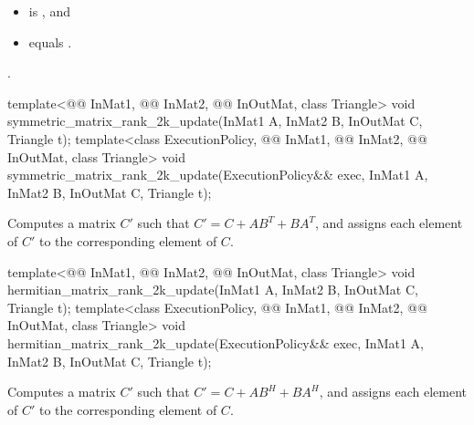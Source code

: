 \pnum
\expects
\begin{itemize}
\item
{} is , and
\item
{} equals .
\end{itemize}

\pnum
\complexity
{}.

%
\begin{itemdecl}
template<@@ InMat1, @@ InMat2,
         @@ InOutMat, class Triangle>
  void symmetric_matrix_rank_2k_update(InMat1 A, InMat2 B, InOutMat C, Triangle t);
template<class ExecutionPolicy, @@ InMat1, @@ InMat2,
         @@ InOutMat, class Triangle>
  void symmetric_matrix_rank_2k_update(ExecutionPolicy&& exec,
                                       InMat1 A, InMat2 B, InOutMat C, Triangle t);
\end{itemdecl}

\begin{itemdescr}
\pnum
\effects
Computes a matrix $C'$ such that $C' = C + A B^T + B A^T$,
and assigns each element of $C'$ to the corresponding element of $C$.
\end{itemdescr}

%
\begin{itemdecl}
template<@@ InMat1, @@ InMat2,
         @@ InOutMat, class Triangle>
  void hermitian_matrix_rank_2k_update(InMat1 A, InMat2 B, InOutMat C, Triangle t);
template<class ExecutionPolicy,
         @@ InMat1, @@ InMat2,
         @@ InOutMat, class Triangle>
  void hermitian_matrix_rank_2k_update(ExecutionPolicy&& exec,
                                       InMat1 A, InMat2 B, InOutMat C, Triangle t);
\end{itemdecl}

\begin{itemdescr}
\pnum
\effects
Computes a matrix $C'$ such that $C' = C + A B^H + B A^H$,
and assigns each element of $C'$ to the corresponding element of $C$.
\end{itemdescr}

